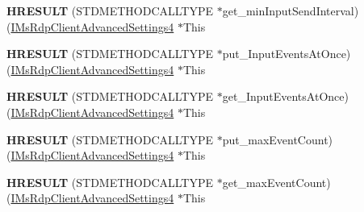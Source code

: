 \begin{DoxyCompactItemize}
\item 
\mbox{\label{struct_m_s_t_s_c_lib_1_1_i_ms_rdp_client_advanced_settings4_vtbl_aa2dcd944d343ae95c93a9efd0ba2ce89}} 
{\bfseries H\+R\+E\+S\+U\+LT} (S\+T\+D\+M\+E\+T\+H\+O\+D\+C\+A\+L\+L\+T\+Y\+PE $\ast$get\+\_\+min\+Input\+Send\+Interval)(\hyperlink{interface_m_s_t_s_c_lib_1_1_i_ms_rdp_client_advanced_settings4}{I\+Ms\+Rdp\+Client\+Advanced\+Settings4} $\ast$This
\item 
\mbox{\label{struct_m_s_t_s_c_lib_1_1_i_ms_rdp_client_advanced_settings4_vtbl_ab6266b6bbef8fa5a2870c446e43a4343}} 
{\bfseries H\+R\+E\+S\+U\+LT} (S\+T\+D\+M\+E\+T\+H\+O\+D\+C\+A\+L\+L\+T\+Y\+PE $\ast$put\+\_\+\+Input\+Events\+At\+Once)(\hyperlink{interface_m_s_t_s_c_lib_1_1_i_ms_rdp_client_advanced_settings4}{I\+Ms\+Rdp\+Client\+Advanced\+Settings4} $\ast$This
\item 
\mbox{\label{struct_m_s_t_s_c_lib_1_1_i_ms_rdp_client_advanced_settings4_vtbl_adb61a85f03174c175b9e45b243a3f773}} 
{\bfseries H\+R\+E\+S\+U\+LT} (S\+T\+D\+M\+E\+T\+H\+O\+D\+C\+A\+L\+L\+T\+Y\+PE $\ast$get\+\_\+\+Input\+Events\+At\+Once)(\hyperlink{interface_m_s_t_s_c_lib_1_1_i_ms_rdp_client_advanced_settings4}{I\+Ms\+Rdp\+Client\+Advanced\+Settings4} $\ast$This
\item 
\mbox{\label{struct_m_s_t_s_c_lib_1_1_i_ms_rdp_client_advanced_settings4_vtbl_a8b314cecbed0e42ba976b7b9ffe87fbb}} 
{\bfseries H\+R\+E\+S\+U\+LT} (S\+T\+D\+M\+E\+T\+H\+O\+D\+C\+A\+L\+L\+T\+Y\+PE $\ast$put\+\_\+max\+Event\+Count)(\hyperlink{interface_m_s_t_s_c_lib_1_1_i_ms_rdp_client_advanced_settings4}{I\+Ms\+Rdp\+Client\+Advanced\+Settings4} $\ast$This
\item 
\mbox{\label{struct_m_s_t_s_c_lib_1_1_i_ms_rdp_client_advanced_settings4_vtbl_a90345adab9ee94af795156b91f9603d5}} 
{\bfseries H\+R\+E\+S\+U\+LT} (S\+T\+D\+M\+E\+T\+H\+O\+D\+C\+A\+L\+L\+T\+Y\+PE $\ast$get\+\_\+max\+Event\+Count)(\hyperlink{interface_m_s_t_s_c_lib_1_1_i_ms_rdp_client_advanced_settings4}{I\+Ms\+Rdp\+Client\+Advanced\+Settings4} $\ast$This
\item 

\end{DoxyCompactItemize}
